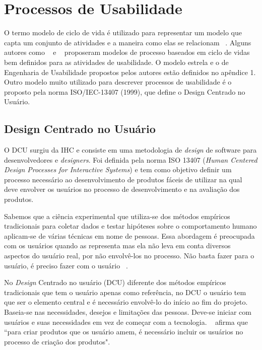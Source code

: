 
\section{Processos de Usabilidade}


	O termo modelo de ciclo de vida é utilizado para representar um modelo que capta um conjunto de atividades e a maneira como elas se relacionam ~\cite{preece2007}. Alguns autores como ~ e ~ proposeram modelos de processo baseados em ciclo de vidas bem definidos para as atividades de usabilidade. O modelo estrela e o de Engenharia de Usabilidade propostos pelos autores estão definidos no apêndice 1. 
	Outro modelo muito utilizado para descrever processos de usabilidade é o proposto pela norma ISO/IEC-13407 (1999), que define o Design Centrado no Usuário.


\subsection{Design Centrado no Usuário}

O DCU surgiu da IHC e consiste em uma metodologia de \emph{design} de software para desenvolvedores e \emph{designers}. Foi definida pela norma ISO 13407 (\textit{Human Centered Design Processes for Interactive Systems}) e tem como objetivo definir um processo necessário ao desenvolvimento de produtos fáceis de utilizar na qual deve envolver os usuários no processo de desenvolvimento e na avaliação dos produtos.

Sabemos que a ciência experimental que utiliza-se dos métodos empíricos tradicionais para coletar dados e testar hipóteses sobre o comportamento humano aplicam-se de várias técnicas em nome de pessoas. Essa abordagem é preocupada com os usuários quando as representa mas ela não leva em conta diversos aspectos do usuário real, por não envolvê-los no processo. Não basta fazer para o usuário, é preciso fazer com o usuário ~\cite{eason1995}. 

No \emph{Design} Centrado no usuário (DCU) diferente dos métodos empíricos tradicionais que tem o usuário apenas como  referência, no DCU o usuário tem que ser o elemento central e é necessário envolvê-lo do início ao fim do projeto. Baseia-se nas necessidades, desejos e limitações das pessoas. Deve-se iniciar com usuários e suas necessidades em vez de começar com a tecnologia. ~ afirma que ``para criar produtos que os usuário amem, é necessário incluir os usuários no processo de criação dos produtos". 

